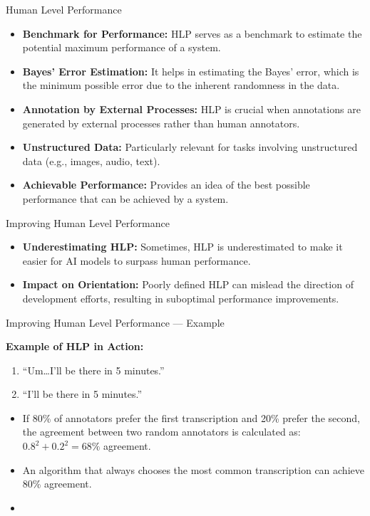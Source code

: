 \begin{frame}{Human Level Performance}

\begin{itemize}
\item \textbf{Benchmark for Performance:} HLP serves as a benchmark to
  estimate the potential maximum performance of a system.
\item \textbf{Bayes' Error Estimation:} It helps in estimating the
  Bayes' error, which is the minimum possible error due to the
  inherent randomness in the data.
\item \textbf{Annotation by External Processes:} HLP is crucial when
  annotations are generated by external processes rather than human
  annotators.
\item \textbf{Unstructured Data:} Particularly relevant for tasks
  involving unstructured data (e.g., images, audio, text).
\item \textbf{Achievable Performance:} Provides an idea of the best
  possible performance that can be achieved by a system.
\end{itemize}

\end{frame}

\begin{frame}{Improving Human Level Performance}

\begin{itemize}
\item \textbf{Underestimating HLP:} Sometimes, HLP is underestimated
  to make it easier for AI models to surpass human performance.
\item \textbf{Impact on Orientation:} Poorly defined HLP can mislead
  the direction of development efforts, resulting in suboptimal
  performance improvements.
\end{itemize}

\end{frame}

\begin{frame}{Improving Human Level Performance — Example}

\textbf{Example of HLP in Action:}
\begin{enumerate}
    \item ``Um\dots I'll be there in 5 minutes.''
    \item ``I'll be there in 5 minutes.''
\end{enumerate}

\begin{itemize}
\item If 80\% of annotators prefer the first transcription and 20\%
  prefer the second, the agreement between two random annotators is
  calculated as: \(0.8^2 + 0.2^2 = 68\%\) agreement.
\item An algorithm that always chooses the most common transcription
  can achieve 80\% agreement.
\item {}
\end{itemize}

  \hugo
\end{frame}

